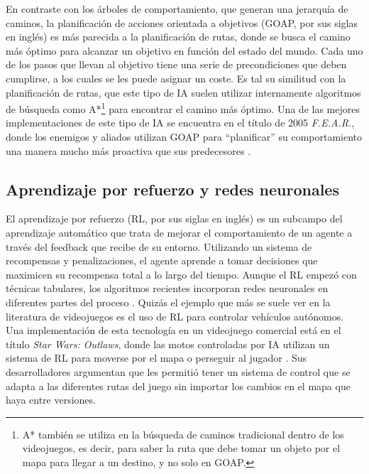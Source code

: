 En contraste con los árboles de comportamiento, que generan una jerarquía de caminos, la planificación de acciones orientada a objetivos (GOAP, por sus siglas en inglés) es más parecida a la planificación de rutas, donde se busca el camino más óptimo para alcanzar un objetivo en función del estado del mundo. Cada uno de los pasos que llevan al objetivo tiene una serie de precondiciones que deben cumplirse, a los cuales se les puede asignar un coste. Es tal su similitud con la planificación de rutas, que este tipo de IA suelen utilizar internamente algoritmos de búsqueda como A*\footnote{A* también se utiliza en la búsqueda de caminos tradicional dentro de los videojuegos, es decir, para saber la ruta que debe tomar un objeto por el mapa para llegar a un destino, y no solo en GOAP.} para encontrar el camino más óptimo. Una de las mejores implementaciones de este tipo de IA se encuentra en el título de 2005 \textit{F.E.A.R.}, donde los enemigos y aliados utilizan GOAP para ``planificar'' su comportamiento una manera mucho más proactiva que sus predecesores \cite{jeff_gdc_2006}.


\subsection{Aprendizaje por refuerzo y redes neuronales}

El aprendizaje por refuerzo (RL, por sus siglas en inglés) es un subcampo del aprendizaje automático que trata de mejorar el comportamiento de un agente a través del feedback que recibe de su entorno. Utilizando un sistema de recompensas y penalizaciones, el agente aprende a tomar decisiones que maximicen su recompensa total a lo largo del tiempo. Aunque el RL empezó con técnicas tabulares, los algoritmos recientes incorporan redes neuronales en diferentes partes del proceso \cite{ghasemi_comprehensive_2025}. Quizás el ejemplo que más se suele ver en la literatura de videojuegos es el uso de RL para controlar vehículos autónomos. Una implementación de esta tecnología en un videojuego comercial está en el título \textit{Star Wars: Outlaws}, donde las motos controladas por IA utilizan un sistema de RL para moverse por el mapa o perseguir al jugador \cite{gaudreau_game_2025}. Sus desarrolladores argumentan que les permitió tener un sistema de control que se adapta a las diferentes rutas del juego sin importar los cambios en el mapa que haya entre versiones.

